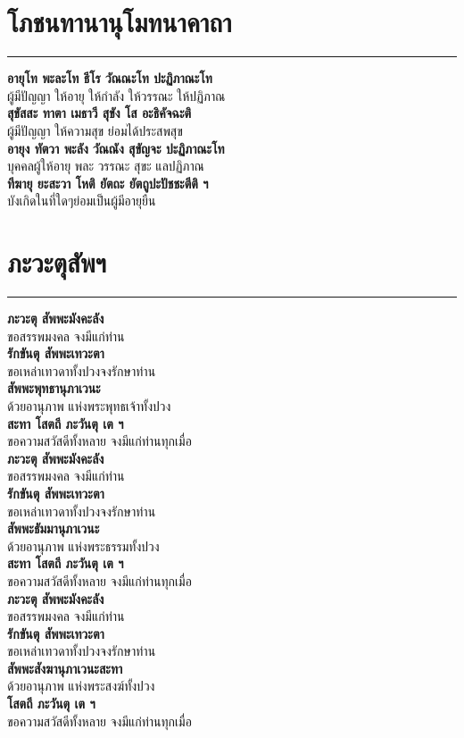\documentclass[12pt]{article}
\begin{document}
\section{โภชนทานานุโมทนาคาถา}
\hrule
\textbf{อายุโท พะละโท ธีโร วัณณะโท ปะฏิภาณะโท}\\
\indent ผู้มีปัญญา ให้อายุ ให้กำลัง ให้วรรณะ ให้ปฏิภาณ\\
\textbf{สุขัสสะ ทาตา เมธาวี สุขัง โส อะธิคัจฉะติ}\\
\indent ผู้มีปัญญา ให้ความสุข ย่อมได้ประสพสุข\\
\textbf{อายุง ทัตวา พะลัง วัณณัง สุขัญจะ ปะฏิภาณะโท}\\
\indent บุคคลผู้ให้อายุ พละ วรรณะ สุขะ แลปฏิภาณ\\
\textbf{ทีฆายุ ยะสะวา โหติ ยัตถะ ยัตถูปะปัชชะตีติ ฯ}\\
\indent บังเกิดในที่ใดๆย่อมเป็นผู้มีอายุยืน\\


\pagebreak
\section{ภะวะตุสัพฯ}
\hrule
\textbf{ภะวะตุ สัพพะมังคะลัง}\\
\indent ขอสรรพมงคล จงมีแก่ท่าน\\
\textbf{รักขันตุ สัพพะเทวะตา}\\
\indent ขอเหล่าเทวดาทั้งปวงจงรักษาท่าน\\
\textbf{สัพพะพุทธานุภาเวนะ}\\
\indent ด้วยอานุภาพ แห่งพระพุทธเจ้าทั้งปวง\\
\textbf{สะทา โสตถี ภะวันตุ เต ฯ}\\
\indent ขอความสวัสดีทั้งหลาย จงมีแก่ท่านทุกเมื่อ\\
\textbf{ภะวะตุ สัพพะมังคะลัง}\\
\indent ขอสรรพมงคล จงมีแก่ท่าน\\
\textbf{รักขันตุ สัพพะเทวะตา}\\
\indent ขอเหล่าเทวดาทั้งปวงจงรักษาท่าน\\
\textbf{สัพพะธัมมานุภาเวนะ}\\
\indent ด้วยอานุภาพ แห่งพระธรรมทั้งปวง\\
\textbf{สะทา โสตถี ภะวันตุ เต ฯ}\\
\indent ขอความสวัสดีทั้งหลาย จงมีแก่ท่านทุกเมื่อ\\
\textbf{ภะวะตุ สัพพะมังคะลัง}\\
\indent ขอสรรพมงคล จงมีแก่ท่าน\\
\textbf{รักขันตุ สัพพะเทวะตา}\\
\indent ขอเหล่าเทวดาทั้งปวงจงรักษาท่าน\\
\textbf{สัพพะสังฆานุภาเวนะสะทา}\\
\indent ด้วยอานุภาพ แห่งพระสงฆ์ทั้งปวง\\
\textbf{โสตถี ภะวันตุ เต ฯ}\\
\indent ขอความสวัสดีทั้งหลาย จงมีแก่ท่านทุกเมื่อ
\end{document}
